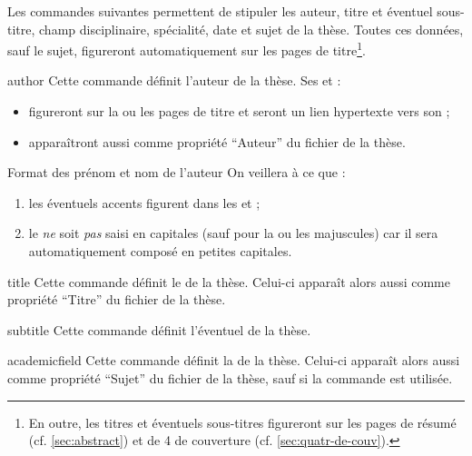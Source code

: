 Les commandes suivantes permettent de stipuler les auteur, titre et éventuel
sous-titre, champ disciplinaire, spécialité, date et sujet de la thèse. Toutes
ces données, sauf le sujet, figureront automatiquement sur les pages de
titre\footnote{En outre, les titres et éventuels sous-titres figureront sur les
  pages de résumé (cf. \vref{sec:abstract}) et de 4\ieme{} de couverture (cf.
  \vref{sec:quatr-de-couv}).}.
%
\begin{docCommand}[doc description=\mandatory]{author}{}
  Cette commande définit l'auteur de la thèse. Ses
   et  :
  \begin{itemize}
  \item figureront sur la ou les pages de titre et seront un lien
    hypertexte vers son ;
  \item apparaîtront aussi comme propriété \enquote{Auteur} du
    fichier \pdf de la thèse.
  \end{itemize}
  \begin{dbwarning}{Format des prénom et nom de l'auteur}{}
    On veillera à ce que :
    \begin{enumerate}
    \item les éventuels accents figurent dans les  et
      ;
    \item le  \emph{ne} soit \emph{pas} saisi en capitales
      (sauf pour la ou les majuscules) car il sera automatiquement
      composé en petites capitales.
    \end{enumerate}
  \end{dbwarning}
\end{docCommand}
%
\begin{docCommand}[doc description=\mandatory]{title}{}
  Cette commande définit le  de la thèse. Celui-ci apparaît alors
  aussi comme propriété \enquote{Titre} du fichier \pdf de la thèse.
\end{docCommand}
%
\begin{docCommand}{subtitle}{}
  Cette commande définit l'éventuel  de la thèse.
\end{docCommand}
%
\begin{docCommand}[doc description=\mandatory]{academicfield}{}
  Cette commande définit la  
  de la thèse. Celui-ci apparaît alors aussi comme propriété \enquote{Sujet} du
  fichier \pdf de la thèse, sauf si la commande  est utilisée.
\end{docCommand}
